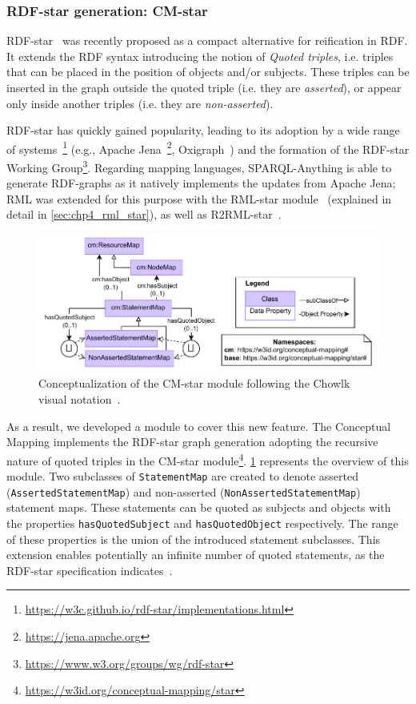 \subsubsection{RDF-star generation: CM-star}
\label{sec:chp4_cm-star}
RDF-star~\cite{hartig2017foundations} was recently proposed as a compact alternative for reification in RDF. It extends the RDF syntax introducing the notion of \textit{Quoted triples}, i.e. triples that can be placed in the position of objects and/or subjects. These triples can be inserted in the graph outside the quoted triple (i.e. they are \textit{asserted}), or appear only inside another triples (i.e. they are \textit{non-asserted}).

RDF-star has quickly gained popularity, leading
to its adoption by a wide range of systems~\footnote{\url{https://w3c.github.io/rdf-star/implementations.html}} (e.g., Apache Jena~\footnote{\url{https://jena.apache.org}}, Oxigraph~\cite{oxigraph}) and the formation of the RDF-star Working Group\footnote{\url{https://www.w3.org/groups/wg/rdf-star}}. 
Regarding mapping languages, SPARQL-Anything is able to generate RDF-graphs as it natively implements the updates from Apache Jena; RML was extended for this purpose with the RML-star module~\cite{iglesias2022rmlstar,delva2021rml-star,iglesias2023rml} (explained in detail in \cref{sec:chp4_rml_star}), as well as R2RML-star~\cite{sundqvist2022extending}.

\begin{figure}[!t]
\centering
\includegraphics[width=1\linewidth]{figures/chp4-2_cm-star.pdf}
\caption[CM-star module]{Conceptualization of the CM-star module following the Chowlk visual notation~\cite{feria2022chowlk}.}
\label{fig:chp4-2_cm-star}
\end{figure}




As a result, we developed a module to cover this new feature. The Conceptual Mapping implements the RDF-star graph generation adopting the recursive nature of quoted triples in the CM-star module\footnote{\url{https://w3id.org/conceptual-mapping/star}}. \cref{fig:chp4-2_cm-star} represents the overview of this module. Two subclasses of \texttt{StatementMap} are created to denote asserted (\texttt{AssertedStatementMap}) and non-asserted (\texttt{NonAssertedStatementMap}) statement maps. These statements can be quoted as subjects and objects with the properties \texttt{hasQuotedSubject} and \texttt{hasQuotedObject} respectively. The range of these properties is the union of the introduced statement subclasses. This extension enables potentially an infinite number of quoted statements, as the RDF-star specification indicates~\cite{hartig2023rdf}. 



